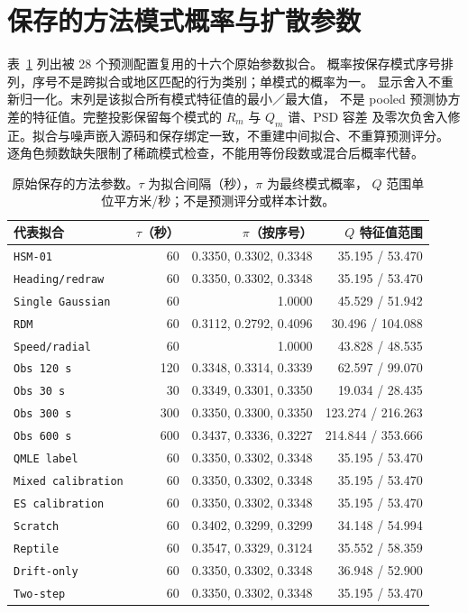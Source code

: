\section{保存的方法模式概率与扩散参数}
\label{sec:method-noise-parameters}\hypertarget{sec:method-noise-parameters}{}
表~\ref{tab:method-noise-parameters} 列出被 28 个预测配置复用的十六个原始参数拟合。
概率按保存模式序号排列，序号不是跨拟合或地区匹配的行为类别；单模式的概率为一。
显示舍入不重新归一化。末列是该拟合所有模式特征值的最小／最大值，
不是 pooled 预测协方差的特征值。完整投影保留每个模式的 $R_m$ 与 $Q_m$ 谱、PSD 容差
及零次负舍入修正。拟合与噪声嵌入源码和保存绑定一致，不重建中间拟合、不重算预测评分。
逐角色频数缺失限制了稀疏模式检查，不能用等份段数或混合后概率代替。

\begin{table}[htbp]
\centering\footnotesize
\caption{原始保存的方法参数。$\tau$ 为拟合间隔（秒），$\pi$ 为最终模式概率，
$Q$ 范围单位平方米/秒；不是预测评分或样本计数。}
\label{tab:method-noise-parameters}\hypertarget{tab:method-noise-parameters}{}
\begin{tabular}{lrrr}
\toprule
代表拟合 & $\tau$（秒） & $\pi$（按序号） & $Q$ 特征值范围\\
\midrule
\texttt{HSM-01} & 60 & 0.3350, 0.3302, 0.3348 & 35.195 / 53.470\\
\texttt{Heading/redraw} & 60 & 0.3350, 0.3302, 0.3348 & 35.195 / 53.470\\
\texttt{Single Gaussian} & 60 & 1.0000 & 45.529 / 51.942\\
\texttt{RDM} & 60 & 0.3112, 0.2792, 0.4096 & 30.496 / 104.088\\
\texttt{Speed/radial} & 60 & 1.0000 & 43.828 / 48.535\\
\texttt{Obs 120 s} & 120 & 0.3348, 0.3314, 0.3339 & 62.597 / 99.070\\
\texttt{Obs 30 s} & 30 & 0.3349, 0.3301, 0.3350 & 19.034 / 28.435\\
\texttt{Obs 300 s} & 300 & 0.3350, 0.3300, 0.3350 & 123.274 / 216.263\\
\texttt{Obs 600 s} & 600 & 0.3437, 0.3336, 0.3227 & 214.844 / 353.666\\
\texttt{QMLE label} & 60 & 0.3350, 0.3302, 0.3348 & 35.195 / 53.470\\
\texttt{Mixed calibration} & 60 & 0.3350, 0.3302, 0.3348 & 35.195 / 53.470\\
\texttt{ES calibration} & 60 & 0.3350, 0.3302, 0.3348 & 35.195 / 53.470\\
\texttt{Scratch} & 60 & 0.3402, 0.3299, 0.3299 & 34.148 / 54.994\\
\texttt{Reptile} & 60 & 0.3547, 0.3329, 0.3124 & 35.552 / 58.359\\
\texttt{Drift-only} & 60 & 0.3350, 0.3302, 0.3348 & 36.948 / 52.900\\
\texttt{Two-step} & 60 & 0.3350, 0.3302, 0.3348 & 35.195 / 53.470\\
\bottomrule
\end{tabular}
\end{table}



